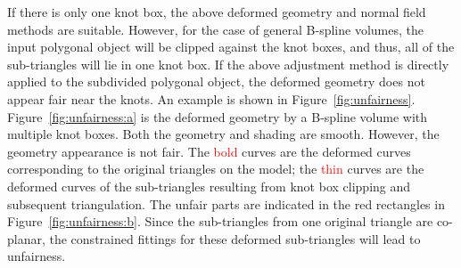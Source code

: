 \documentclass[3p]{elsarticle}
\begin{document}
If there is only one knot box, the above deformed geometry and normal field methods are suitable. However, for the case
of general B-spline volumes, the input polygonal object will be clipped against the knot boxes, and thus, all of the
sub-triangles will lie in one knot box. If the above adjustment method is directly applied to the subdivided polygonal
object, the deformed geometry does not appear fair near the knots. An example is shown in Figure~\ref{fig:unfairness}.
Figure~\ref{fig:unfairness:a} is the deformed geometry by a B-spline volume with multiple knot boxes. Both the geometry
and shading are smooth. However, the geometry appearance is not fair. The \textcolor{red}{bold} curves are the deformed
curves corresponding to the original triangles on the model; the \textcolor{red}{thin} curves are the deformed curves of
the sub-triangles resulting from knot box clipping and subsequent triangulation. The unfair parts are indicated in the
red rectangles in Figure~\ref{fig:unfairness:b}. Since the sub-triangles from one original triangle are co-planar, the
constrained fittings for these deformed sub-triangles will lead to unfairness.
\end{document}
